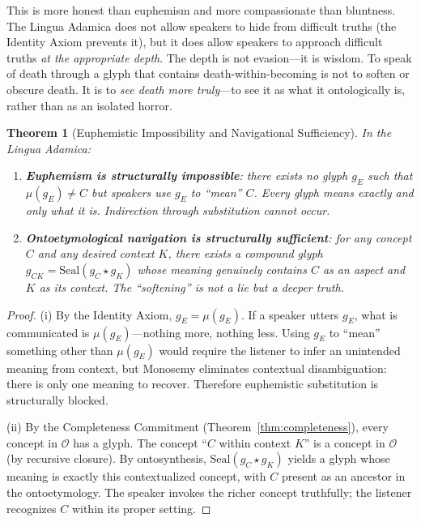 \documentclass[12pt, letterpaper]{book}
\def\equiv{=}%
\def\mathfrak#1{#1}%
\newtheorem{theorem}{Theorem}[chapter]
\begin{document}
This is more honest than euphemism and more compassionate than bluntness. The Lingua Adamica does not allow speakers to hide from difficult truths (the Identity Axiom prevents it), but it does allow speakers to approach difficult truths \textit{at the appropriate depth}. The depth is not evasion---it is wisdom. To speak of death through a glyph that contains death-within-becoming is not to soften or obscure death. It is to \textit{see death more truly}---to see it as what it ontologically is, rather than as an isolated horror.

\begin{theorem}[Euphemistic Impossibility and Navigational Sufficiency]\label{thm:euphemism}
In the Lingua Adamica:
\begin{enumerate}[label=(\roman*)]
    \item \textbf{Euphemism is structurally impossible}: there exists no glyph $\mathfrak{g}_E$ such that $\mu(\mathfrak{g}_E) \neq C$ but speakers use $\mathfrak{g}_E$ to ``mean'' $C$. Every glyph means exactly and only what it is. Indirection through substitution cannot occur.
    \item \textbf{Ontoetymological navigation is structurally sufficient}: for any concept $C$ and any desired context $K$, there exists a compound glyph $\mathfrak{g}_{CK} \equiv \mathrm{Seal}(\mathfrak{g}_C \star \mathfrak{g}_K)$ whose meaning genuinely contains $C$ as an aspect and $K$ as its context. The ``softening'' is not a lie but a deeper truth.
\end{enumerate}
\end{theorem}

\begin{proof}
(i) By the Identity Axiom, $\mathfrak{g}_E \equiv \mu(\mathfrak{g}_E)$. If a speaker utters $\mathfrak{g}_E$, what is communicated is $\mu(\mathfrak{g}_E)$---nothing more, nothing less. Using $\mathfrak{g}_E$ to ``mean'' something other than $\mu(\mathfrak{g}_E)$ would require the listener to infer an unintended meaning from context, but Monosemy eliminates contextual disambiguation: there is only one meaning to recover. Therefore euphemistic substitution is structurally blocked.

(ii) By the Completeness Commitment (Theorem~\ref{thm:completeness}), every concept in $\mathcal{O}$ has a glyph. The concept ``$C$ within context $K$'' is a concept in $\mathcal{O}$ (by recursive closure). By ontosynthesis, $\mathrm{Seal}(\mathfrak{g}_C \star \mathfrak{g}_K)$ yields a glyph whose meaning is exactly this contextualized concept, with $C$ present as an ancestor in the ontoetymology. The speaker invokes the richer concept truthfully; the listener recognizes $C$ within its proper setting.
\end{proof}
\end{document}
